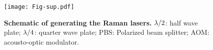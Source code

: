 \documentclass[aps,prl,twocolumn,floatfix,reprint]{revtex4}
\begin{document}
\begin{widetext}
\begin{figure}[tbp]
\centerline{
\texttt{[image: Fig-sup.pdf]}}
\caption{\textbf{Schematic of generating the Raman lasers.} $\protect\lambda %
/2$: half wave plate; $\protect\lambda /4$: quarter wave plate; PBS:
Polarized beam splitter; AOM: acousto-optic modulator. }
\label{Fig1}
\end{figure}

\end{widetext}
\end{document}
